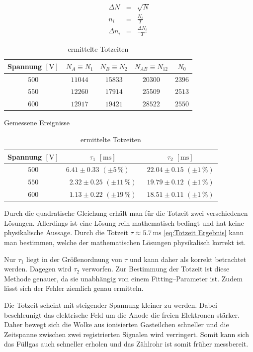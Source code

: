 \documentclass[12pt,a4paper]{scrartcl}
\numberwithin{equation}{section} %
\begin{document}
\begin{eqnarray}
	\Delta N &=& \sqrt{N} \\
	n_i &=& \frac{N_i}{T} \\
	\Delta n_i &=& \frac{\Delta N_i}{T}
\end{eqnarray}

\begin{table}[h!]
	\centering
	\begin{tabular}[h]{c|c|c|c|c}
		Spannung $[\mathrm V]$
			& $N_A\equiv N_1$
			& $N_B\equiv N_2$
			& $N_{AB}\equiv N_{12}$
			& $N_0$ \\
		\hline
		$500$ & $11044$ & $15833$ & $20300$ & $2396$ \\
		$550$ & $12260$ & $17914$ & $25509$ & $2513$ \\
		$600$ & $12917$ & $19421$ & $28522$ & $2550$ \\
	\end{tabular}
	\caption{Gemessene Ereignisse}
	\label{tab:Totzeit Ereignisse}
	\vspace{12pt}

	\begin{tabular}[h]{c|c|c}
		Spannung $[\mathrm V]$
		& $\tau_1$ $[\mathrm{ms}]$
		& $\tau_2$ $[\mathrm{ms}]$ \\
		\hline
		$500$ & $6.41 \pm 0.33$ $(\pm 5 \,\%)$\ \ \  & $22.04 \pm 0.15$ $(\pm 1 \,\%)$ \\
		$550$ & $2.32 \pm 0.25$ $(\pm 11 \,\%)$ & $19.79 \pm 0.12$ $(\pm 1 \,\%)$ \\
		$600$ & $1.13 \pm 0.22$ $(\pm 19 \,\%)$ & $18.51 \pm 0.11$ $(\pm 1 \,\%)$ \\
	\end{tabular}
	\caption{ermittelte Totzeiten}
	\label{tab:Totzeiten}
\end{table}

\noindent
Durch die quadratische Gleichung erhält man für die Totzeit zwei verschiedenen Lösungen. Allerdings ist eine Lösung rein mathematisch bedingt und hat keine physikalische Aussage. Durch die Totzeit $\tau\approx 5.7 \mathrm{\,ms}$ \eqref{eq:Totzeit Ergebnis} kann man bestimmen, welche der mathematischen Lösungen physikalisch korrekt ist.

Nur $\tau_1$ liegt in der Größenordnung von $\tau$ und kann daher als korrekt betrachtet werden. Dagegen wird $\tau _2$ verworfen. Zur Bestimmung der Totzeit ist diese Methode genauer, da sie unabhängig von einem Fitting--Parameter ist. Zudem lässt sich der Fehler ziemlich genau ermitteln.

Die Totzeit scheint mit steigender Spannung kleiner zu werden. Dabei beschleunigt das elektrische Feld um die Anode die freien Elektronen stärker. Daher bewegt sich die Wolke aus ionisierten Gasteilchen schneller und die Zeitspanne zwischen zwei registrierten Signalen wird verringert. Somit kann sich das Füllgas auch schneller erholen und das Zählrohr ist somit früher messbereit.
\end{document}
